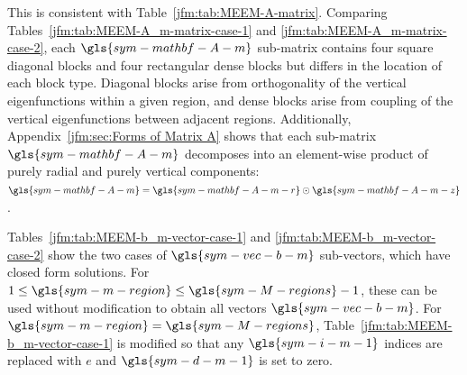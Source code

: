 \documentclass[lineno]{JFM-FLM_Au}
\begin{document}
This is consistent with Table~\ref{jfm:tab:MEEM-A-matrix}. 
Comparing Tables~\ref{jfm:tab:MEEM-A_m-matrix-case-1} and \ref{jfm:tab:MEEM-A_m-matrix-case-2},
each $\gls{sym-mathbf-A-m}$ sub-matrix contains four square diagonal blocks and four rectangular dense blocks but differs in the location of each block type.
Diagonal blocks arise from orthogonality of the vertical eigenfunctions within a given region,
and dense blocks arise from coupling of the vertical eigenfunctions between adjacent regions.
Additionally, Appendix~\ref{jfm:sec:Forms of Matrix A} shows that each sub-matrix $\gls{sym-mathbf-A-m}$ decomposes into an element-wise product of purely radial and purely vertical components:
$\gls{sym-mathbf-A-m} = \gls{sym-mathbf-A-m-r} \odot \gls{sym-mathbf-A-m-z}$.

Tables~\ref{jfm:tab:MEEM-b_m-vector-case-1} and \ref{jfm:tab:MEEM-b_m-vector-case-2} 
show the two cases of $\gls{sym-vec-b-m}$ sub-vectors, which have closed form solutions.
For $1 \le \gls{sym-m-region} \le \gls{sym-M-regions}-1$, these can be used without modification to obtain all vectors $\gls{sym-vec-b-m}$.
For $\gls{sym-m-region}=\gls{sym-M-regions}$, Table~\ref{jfm:tab:MEEM-b_m-vector-case-1} is modified so that any $\gls{sym-i-m-1}$ indices are replaced with $e$ and $\gls{sym-d-m-1}$ is set to zero. 
\end{document}
